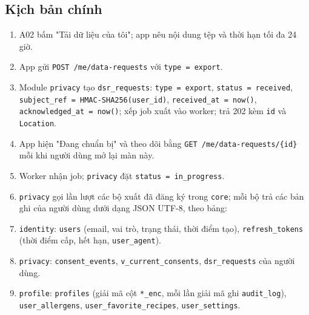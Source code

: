 \subsection{Kịch bản chính}
\begin{enumerate}
\item A02 bấm "Tải dữ liệu của tôi"; app nêu nội dung tệp và thời hạn tối đa 24 giờ.
\item App gửi {\small\texttt{POST /\allowbreak{}\allowbreak{}me/\allowbreak{}\allowbreak{}data-\allowbreak{}requests}} với {\small\texttt{type = export}}.
\item Module {\small\texttt{privacy}} tạo {\small\texttt{dsr\_\allowbreak{}\allowbreak{}requests}}: {\small\texttt{type = export}}, {\small\texttt{status = received}}, {\small\texttt{subject\_\allowbreak{}\allowbreak{}ref = HMAC-\allowbreak{}SHA256(user\_\allowbreak{}\allowbreak{}id)}}, {\small\texttt{received\_\allowbreak{}\allowbreak{}at = now()}}, {\small\texttt{acknowledged\_\allowbreak{}\allowbreak{}at = now()}}; xếp job xuất vào worker; trả 202 kèm {\small\texttt{id}} và {\small\texttt{Location}}.
\item App hiện "Đang chuẩn bị" và theo dõi bằng {\small\texttt{GET /\allowbreak{}\allowbreak{}me/\allowbreak{}\allowbreak{}data-\allowbreak{}requests/\allowbreak{}\allowbreak{}\{id\}}} mỗi khi người dùng mở lại màn này.
\item Worker nhận job; {\small\texttt{privacy}} đặt {\small\texttt{status = in\_\allowbreak{}\allowbreak{}progress}}.
\item {\small\texttt{privacy}} gọi lần lượt các bộ xuất đã đăng ký trong {\small\texttt{core}}; mỗi bộ trả các bản ghi của người dùng dưới dạng JSON UTF-\allowbreak{}8, theo bảng:
\item {\small\texttt{identity}}: {\small\texttt{users}} (email, vai trò, trạng thái, thời điểm tạo), {\small\texttt{refresh\_\allowbreak{}\allowbreak{}tokens}} (thời điểm cấp, hết hạn, {\small\texttt{user\_\allowbreak{}\allowbreak{}agent}}).
\item {\small\texttt{privacy}}: {\small\texttt{consent\_\allowbreak{}\allowbreak{}events}}, {\small\texttt{v\_\allowbreak{}\allowbreak{}current\_\allowbreak{}\allowbreak{}consents}}, {\small\texttt{dsr\_\allowbreak{}\allowbreak{}requests}} của người dùng.
\item {\small\texttt{profile}}: {\small\texttt{profiles}} (giải mã cột {\small\texttt{*\_\allowbreak{}\allowbreak{}enc}}, mỗi lần giải mã ghi {\small\texttt{audit\_\allowbreak{}\allowbreak{}log}}), {\small\texttt{user\_\allowbreak{}\allowbreak{}allergens}}, {\small\texttt{user\_\allowbreak{}\allowbreak{}favorite\_\allowbreak{}\allowbreak{}recipes}}, {\small\texttt{user\_\allowbreak{}\allowbreak{}settings}}.

\end{enumerate}
